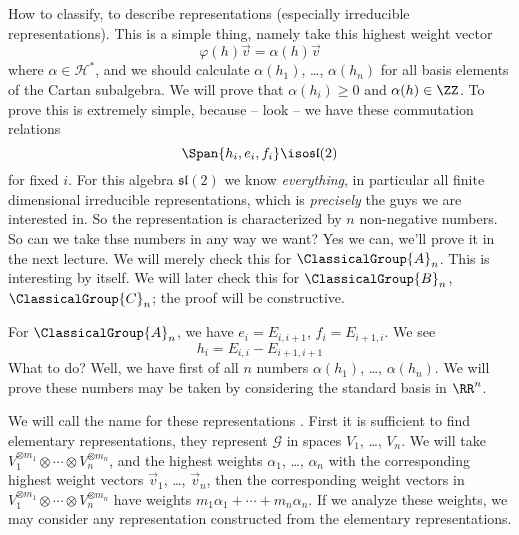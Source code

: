 How to classify, to describe representations (especially
irreducible representations). This is a simple thing, namely take
this highest weight vector
\begin{equation}
\varphi(h)\vec{v}=\alpha(h)\vec{v}
\end{equation}
where $\alpha\in\mathscr{H}^{*}$, and we should calculate
$\alpha(h_{1})$, \dots, $\alpha(h_{n})$ for all basis elements of
the Cartan subalgebra. We will prove that $\alpha(h_{i})\geq0$
and $\alpha(h)\in\ZZ$. To prove this is extremely simple, because
-- look -- we have these commutation relations
\begin{equation}
\Span\{h_{i},e_{i},f_{i}\}\iso\mathfrak{sl}(2)
\end{equation}
for fixed $i$. For this algebra $\mathfrak{sl}(2)$ we
know \emph{everything}, in particular all finite dimensional
irreducible representations, which is \emph{precisely} the guys
we are interested in. So the representation is characterized by
$n$ non-negative numbers. So can we take thse numbers in any way
we want? Yes we can, we'll prove it in the next lecture. We will
merely check this for $\ClassicalGroup{A}_{n}$. This is
interesting by itself. We will later check this for
$\ClassicalGroup{B}_{n}$, $\ClassicalGroup{C}_{n}$; the proof
will be constructive.

For $\ClassicalGroup{A}_{n}$, we have $e_{i}=E_{i,i+1}$,
$f_{i}=E_{i+1,i}$. We see
\begin{equation}
h_{i}=E_{i,i}-E_{i+1,i+1}
\end{equation}
What to do? Well, we have first of all $n$ numbers
$\alpha(h_{1})$, \dots, $\alpha(h_{n})$. We will prove these
numbers may be taken by considering the standard basis in
$\RR^{n}$. 

We will call the name for these
representations . First it is
sufficient to find elementary representations, they represent
$\mathscr{G}$ in spaces $V_{1}$, \dots, $V_{n}$. We will take
$V^{\otimes m_{1}}_{1}\otimes\cdots\otimes V^{\otimes
m_{n}}_{n}$, and the highest weights $\alpha_{1}$, \dots,
$\alpha_{n}$ with the corresponding highest weight vectors
$\vec{v}_{1}$, \dots, $\vec{v}_{n}$, then the corresponding
weight vectors in $V^{\otimes m_{1}}_{1}\otimes\cdots\otimes V^{\otimes
m_{n}}_{n}$ have weights
$m_{1}\alpha_{1}+\cdots+m_{n}\alpha_{n}$. If we analyze these
weights, we may consider any representation constructed from the
elementary representations.

